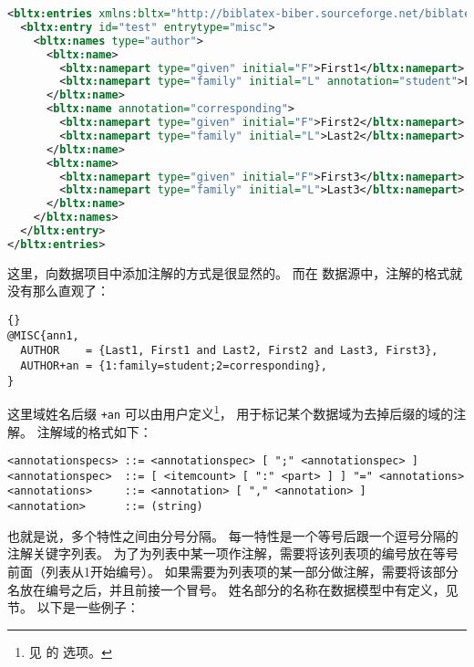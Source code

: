 \begin{lstlisting}[language=xml]
<bltx:entries xmlns:bltx="http://biblatex-biber.sourceforge.net/biblatexml">
  <bltx:entry id="test" entrytype="misc">
    <bltx:names type="author">
      <bltx:name>
        <bltx:namepart type="given" initial="F">First1</bltx:namepart>
        <bltx:namepart type="family" initial="L" annotation="student">Last1</bltx:namepart>
      </bltx:name>
      <bltx:name annotation="corresponding">
        <bltx:namepart type="given" initial="F">First2</bltx:namepart>
        <bltx:namepart type="family" initial="L">Last2</bltx:namepart>
      </bltx:name>
      <bltx:name>
        <bltx:namepart type="given" initial="F">First3</bltx:namepart>
        <bltx:namepart type="family" initial="L">Last3</bltx:namepart>
      </bltx:name>
    </bltx:names>
  </bltx:entry>
</bltx:entries>
\end{lstlisting}
%
这里，向数据项目中添加注解的方式是很显然的。
而在 \BibTeX 数据源中，注解的格式就没有那么直观了：

\begin{lstlisting}[style=bibtex]{}
@MISC{ann1,
  AUTHOR    = {Last1, First1 and Last2, First2 and Last3, First3},
  AUTHOR+an = {1:family=student;2=corresponding},
}
\end{lstlisting}
%
这里域姓名后缀 \texttt{+an} 可以由用户定义\footnote{
	见 \biber 的  选项。}，
用于标记某个数据域为去掉后缀的域的注解。
\BibTeX 注解域的格式如下：

\begin{lstlisting}
<annotationspecs> ::= <annotationspec> [ ";" <annotationspec> ]
<annotationspec>  ::= [ <itemcount> [ ":" <part> ] ] "=" <annotations>
<annotations>     ::= <annotation> [ "," <annotation> ]
<annotation>      ::= (string)
\end{lstlisting}
%
也就是说，多个特性之间由分号分隔。
每一特性是一个等号后跟一个逗号分隔的注解关键字列表。
为了为列表中某一项作注解，需要将该列表项的编号放在等号前面（列表从1开始编号）。
如果需要为列表项的某一部分做注解，需要将该部分名放在编号之后，并且前接一个冒号。
姓名部分的名称在数据模型中有定义，见  节。
以下是一些例子：

